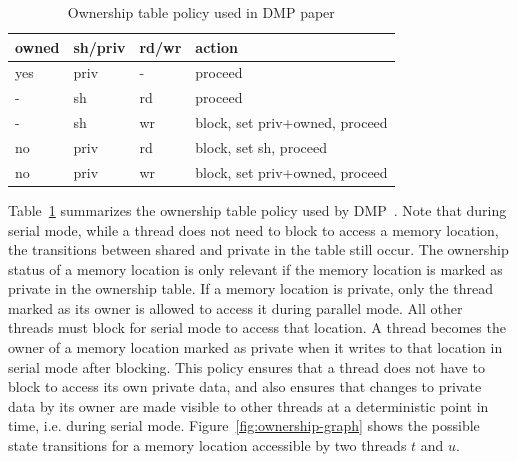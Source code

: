 \begin{table}
  \begin{tabular}{l|l|l|l}
    owned  &  sh/priv  &  rd/wr    &  action                         \\
    \hline
    yes    &  priv     &  -        &  proceed                        \\
    -      &  sh       &  rd       &  proceed                        \\
    -      &  sh       &  wr       &  block, set priv+owned, proceed \\
    no     &  priv     &  rd       &  block, set sh, proceed         \\
    no     &  priv     &  wr       &  block, set priv+owned, proceed \\
  \end{tabular}
  \caption{Ownership table policy used in DMP paper}
  \label{table:ownership-policy}
\end{table}

Table~\ref{table:ownership-policy} summarizes the ownership table
policy used by DMP~\cite{dmp}.  Note that during serial mode, while a
thread does not need to block to access a memory location, the
transitions between shared and private in the table still occur.  The
ownership status of a memory location is only relevant if the memory
location is marked as private in the ownership table.  If a memory
location is private, only the thread marked as its owner is allowed to
access it during parallel mode.  All other threads must block for
serial mode to access that location.  A thread becomes the owner of a
memory location marked as private when it writes to that location in
serial mode after blocking.  This policy ensures that a thread does
not have to block to access its own private data, and also ensures
that changes to private data by its owner are made visible to other
threads at a deterministic point in time, i.e. during serial mode.
Figure~\ref{fig:ownership-graph} shows the possible state transitions
for a memory location accessible by two threads $t$ and $u$.

